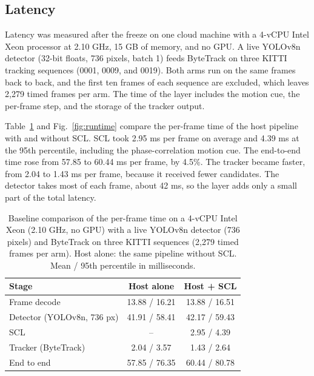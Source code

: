 \documentclass[pdflatex,sn-mathphys-num,iicol]{sn-jnl}
\newcommand{\scl}{SCL}
\begin{document}
\subsection{Latency}\label{sec:latency}
\label{sec:latency-setup}Latency was measured after the freeze on one cloud machine with a 4-vCPU
Intel Xeon processor at 2.10 GHz, 15 GB of memory, and no GPU. A live YOLOv8n
detector (32-bit floats, 736 pixels, batch 1) feeds ByteTrack on three KITTI
tracking sequences (0001, 0009, and 0019). Both arms run on the same frames
back to back, and the first ten frames of each sequence are excluded, which
leaves 2,279 timed frames per arm. The time of the layer includes the motion
cue, the per-frame step, and the storage of the tracker output.

Table~\ref{tab:runtime} and Fig.~\ref{fig:runtime} compare the per-frame time
of the host pipeline with and without \scl{}. \scl{} took 2.95 ms per
frame on average and 4.39 ms at the 95th percentile, including the
phase-correlation motion cue. The end-to-end time rose from 57.85 to 60.44 ms
per frame, by 4.5\%. The tracker became faster, from 2.04 to 1.43 ms per
frame, because it received fewer candidates. The detector takes most of each
frame, about 42 ms, so the layer adds only a small part of the total latency.

\begin{table}[t]
\caption{Baseline comparison of the per-frame time on a 4-vCPU Intel Xeon
(2.10 GHz, no GPU) with a live YOLOv8n detector (736 pixels) and ByteTrack on
three KITTI sequences (2,279 timed frames per arm). Host alone: the same
pipeline without \scl{}. Mean / 95th percentile in milliseconds.}
\label{tab:runtime}
\centering\footnotesize
\setlength{\tabcolsep}{4pt}
\begin{tabular}{@{}lcc@{}}
\toprule
Stage & Host alone & Host + \scl{}\\
\midrule
Frame decode & 13.88 / 16.21 & 13.88 / 16.51\\
Detector (YOLOv8n, 736 px) & 41.91 / 58.41 & 42.17 / 59.43\\
\scl{} & -- & 2.95 / 4.39\\
Tracker (ByteTrack) & 2.04 / 3.57 & 1.43 / 2.64\\
End to end & 57.85 / 76.35 & 60.44 / 80.78\\
\bottomrule
\end{tabular}
\end{table}
\end{document}
